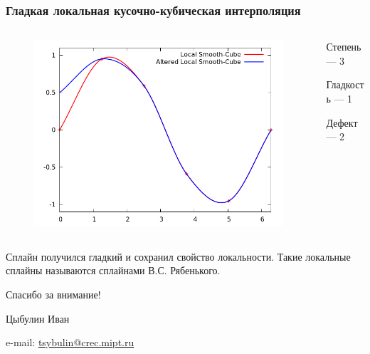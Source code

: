 \documentclass[aspectratio=43,unicode]{beamer}
\newcommand{\colorhref}[2]{\href{#1}{\textcolor{miptbase!30!black}{#2}}}
\begin{document}
\begin{frame}
\frametitle{Гладкая локальная кусочно-кубическая интерполяция}
	\begin{columns}[c]
	\begin{column}{0.6\textwidth}
	\begin{figure}
	\center
	\includegraphics[width=\textwidth]{spline3_1.png}%
	\end{figure}
	\end{column}
	\begin{column}{0.4\textwidth}
	Степень --- 3

	Гладкость --- 1

	Дефект --- 2
	\end{column}
	\end{columns}

	Сплайн получился гладкий и сохранил свойство локальности. Такие локальные сплайны называются сплайнами В.С. Рябенького.
\end{frame}

\begin{frame}[plain]
  \begin{center}
  {\Huge Спасибо за внимание!}
  \vspace{8ex}

  Цыбулин Иван

  e-mail: \colorhref{mailto:tsybulin@crec.mipt.ru}{tsybulin@crec.mipt.ru}
  \end{center}
\end{frame}
\end{document}

